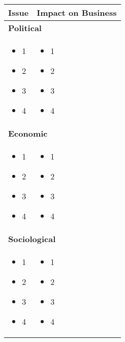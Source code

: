 \begin{tabular}{|p{7cm}|p{7cm}|}
  \hline
  \textbf{Issue} & \textbf{Impact on Business} \\
  \hline
  \multicolumn{2}{|l|}{\textbf{Political}} \\
  \hline
  \begin{itemize}[leftmargin=0.8em]
    \item 1
    \item 2
    \item 3
    \item 4
  \end{itemize}
  &
  \begin{itemize}[leftmargin=0.8em]
    \item 1
    \item 2
    \item 3
    \item 4
  \end{itemize}
  \\
  \hline
  \multicolumn{2}{|l|}{\textbf{Economic}} \\
  \hline
  \begin{itemize}[leftmargin=0.8em]
    \item 1
    \item 2
    \item 3
    \item 4
  \end{itemize}
  &
  \begin{itemize}[leftmargin=0.8em]
    \item 1
    \item 2
    \item 3
    \item 4
  \end{itemize}
  \\
  \hline
  \multicolumn{2}{|l|}{\textbf{Sociological}} \\
  \hline
  \begin{itemize}[leftmargin=0.8em]
    \item 1
    \item 2
    \item 3
    \item 4
  \end{itemize}
  &
  \begin{itemize}[leftmargin=0.8em]
    \item 1
    \item 2
    \item 3
    \item 4
  \end{itemize}

\end{tabular}
